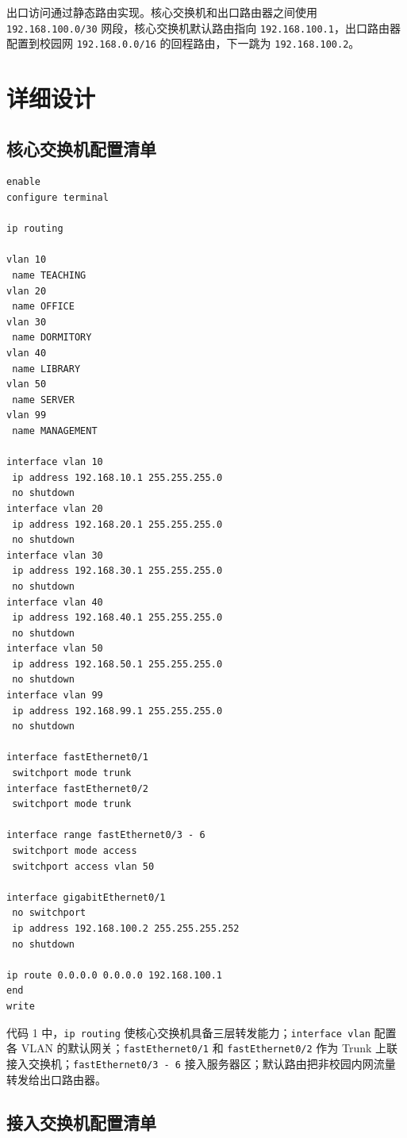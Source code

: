 \documentclass[UTF8,a4paper]{ctexart}
\begin{document}
出口访问通过静态路由实现。核心交换机和出口路由器之间使用 \texttt{192.168.100.0/30} 网段，核心交换机默认路由指向 \texttt{192.168.100.1}，出口路由器配置到校园网 \texttt{192.168.0.0/16} 的回程路由，下一跳为 \texttt{192.168.100.2}。

\section{详细设计}

\subsection{核心交换机配置清单}

\begin{lstlisting}[caption={核心交换机主要配置}]
enable
configure terminal

ip routing

vlan 10
 name TEACHING
vlan 20
 name OFFICE
vlan 30
 name DORMITORY
vlan 40
 name LIBRARY
vlan 50
 name SERVER
vlan 99
 name MANAGEMENT

interface vlan 10
 ip address 192.168.10.1 255.255.255.0
 no shutdown
interface vlan 20
 ip address 192.168.20.1 255.255.255.0
 no shutdown
interface vlan 30
 ip address 192.168.30.1 255.255.255.0
 no shutdown
interface vlan 40
 ip address 192.168.40.1 255.255.255.0
 no shutdown
interface vlan 50
 ip address 192.168.50.1 255.255.255.0
 no shutdown
interface vlan 99
 ip address 192.168.99.1 255.255.255.0
 no shutdown

interface fastEthernet0/1
 switchport mode trunk
interface fastEthernet0/2
 switchport mode trunk

interface range fastEthernet0/3 - 6
 switchport mode access
 switchport access vlan 50

interface gigabitEthernet0/1
 no switchport
 ip address 192.168.100.2 255.255.255.252
 no shutdown

ip route 0.0.0.0 0.0.0.0 192.168.100.1
end
write
\end{lstlisting}

代码 1 中，\texttt{ip routing} 使核心交换机具备三层转发能力；\texttt{interface vlan} 配置各 VLAN 的默认网关；\texttt{fastEthernet0/1} 和 \texttt{fastEthernet0/2} 作为 Trunk 上联接入交换机；\texttt{fastEthernet0/3 - 6} 接入服务器区；默认路由把非校园内网流量转发给出口路由器。

\subsection{接入交换机配置清单}
\end{document}
